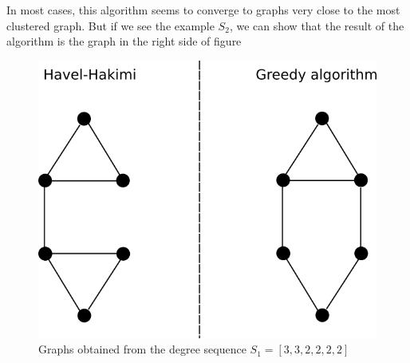 \documentclass{article}
\begin{document}
In most cases, this algorithm seems to converge to graphs very close to the most clustered graph. But if we see the example $S_2$, we can show that the result of the algorithm is the graph in the right side of figure

\begin{figure}[h!]
\centering
\includegraphics[scale=0.8]{./figs/graph_332222.png}
\caption{Graphs obtained from the degree sequence $S_1 = [3, 3, 2, 2, 2, 2]$}
\label{fig:graph_332222}
\end{figure}





\end{document}
